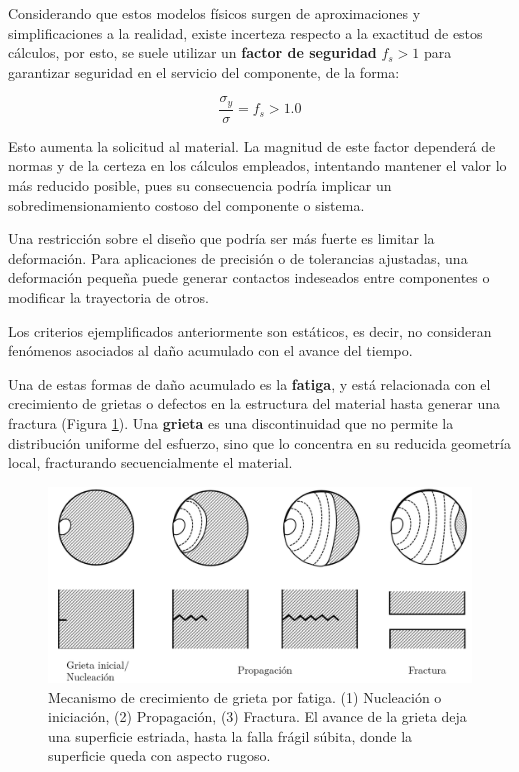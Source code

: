 Considerando que estos modelos físicos surgen de aproximaciones y simplificaciones a la realidad, existe incerteza respecto a la exactitud de estos cálculos, por esto, se suele utilizar un \textbf{factor de seguridad} $f_{s}>1$ para garantizar seguridad en el servicio del componente, de la forma:

\begin{equation}
   \frac{\sigma_{y}}{\sigma} = f_{s}>1.0
\end{equation}

Esto aumenta la solicitud al material. La magnitud de este factor dependerá de normas y de la certeza en los cálculos empleados, intentando mantener el valor lo más reducido posible, pues su consecuencia podría implicar un sobredimensionamiento costoso del componente o sistema.

Una restricción sobre el diseño que podría ser más fuerte es limitar la deformación. Para aplicaciones de precisión o de tolerancias ajustadas, una deformación pequeña puede generar contactos indeseados entre componentes o modificar la trayectoria de otros.

Los criterios ejemplificados anteriormente son estáticos, es decir, no consideran fenómenos asociados al daño acumulado con el avance del tiempo.

Una de estas formas de daño acumulado es la \textbf{fatiga}, y está relacionada con el crecimiento de grietas o defectos en la estructura del material hasta generar una fractura (Figura \ref{crack}). Una \textbf{grieta} es una discontinuidad que no permite la distribución uniforme del esfuerzo, sino que lo concentra en su reducida geometría local, fracturando secuencialmente el material.

\begin{figure}[h!]
    \centering
    \includegraphics[width=0.9\linewidth]{imgs/crack.png}
    \caption{Mecanismo de crecimiento de grieta por fatiga. (1) Nucleación o iniciación, (2) Propagación, (3) Fractura. El avance de la grieta deja una superficie estriada, hasta la falla frágil súbita, donde la superficie queda con aspecto rugoso.}
    \label{crack}
\end{figure}

